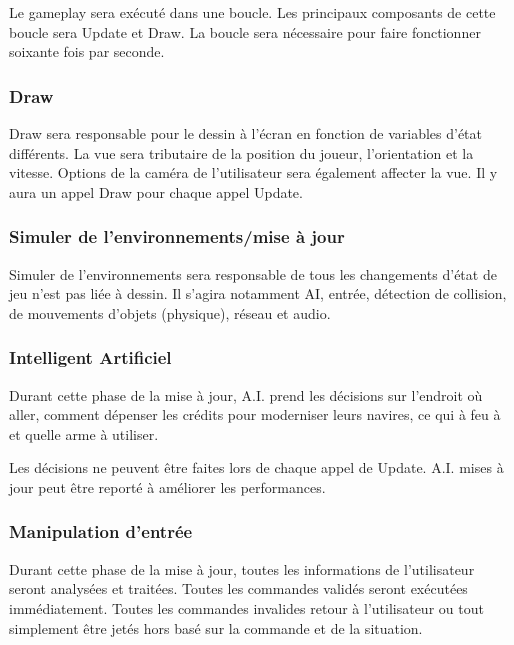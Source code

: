 Le gameplay sera exécuté dans une boucle. Les principaux composants de cette boucle sera Update et Draw. La boucle sera nécessaire pour faire fonctionner soixante fois par seconde.

\subsubsection{Draw} %
\label{ssub:draw}
Draw sera responsable pour le dessin à l'écran en fonction de variables d'état différents. La vue sera tributaire de la position du joueur, l'orientation et la vitesse. Options de la caméra de l'utilisateur sera également affecter la vue. Il y aura un appel Draw pour chaque appel Update.

\subsubsection{Simuler de l'environnements/mise à jour} %
\label{ssub:subsubsection_name}

Simuler de l'environnements sera responsable de tous les changements d'état de jeu n'est pas liée à dessin. Il s'agira notamment AI, entrée, détection de collision, de mouvements d'objets (physique), réseau et audio.



\subsubsection{Intelligent Artificiel } %
\label{ssub:a_i_décisions_}
Durant cette phase de la mise à jour, A.I. prend les décisions sur l'endroit où aller, comment dépenser les crédits pour moderniser leurs navires, ce qui à feu à et quelle arme à utiliser. 

Les décisions ne peuvent être faites lors de chaque appel de Update. A.I. mises à jour peut être reporté à améliorer les performances.


\subsubsection{Manipulation d'entrée} %
\label{ssub:manipulation_d_entrée}

Durant cette phase de la mise à jour, toutes les informations de l'utilisateur seront analysées et traitées. Toutes les commandes validés seront exécutées immédiatement. Toutes les commandes invalides retour à l'utilisateur ou tout simplement être jetés hors basé sur la commande et de la situation. 

